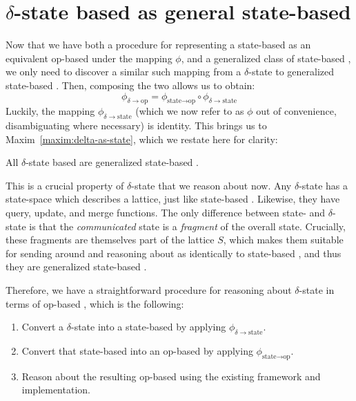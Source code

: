 \section{$\delta$-state based \CRDTs as general state-based \CRDTs}
\label{sec:delta-as-state}
Now that we have both a procedure for representing a state-based \CRDT as an
equivalent op-based \CRDT under the mapping $\phi$, and a generalized class of
state-based \CRDTs, we only need to discover a similar such mapping from a
$\delta$-state to generalized state-based \CRDT.  Then, composing the two allows
us to obtain:
\[
  \phi_{\delta \to \text{op}} =
    \phi_{\text{state} \to \text{op}} \circ
    \phi_{\delta \to \text{state}}
\]
Luckily, the mapping $\phi_{\delta \to \text{state}}$ (which we now refer to
as $\phi$ out of convenience, disambiguating where necessary) is identity.
This brings us to Maxim~\ref{maxim:delta-as-state}, which we restate here for
clarity:

\setcounter{maxim}{1}
\begin{maxim}
  All $\delta$-state based \CRDTs are generalized state-based \CRDTs.
\end{maxim}

This is a crucial property of $\delta$-state \CRDTs that we reason about now. Any
$\delta$-state \CRDT has a state-space which describes a lattice, just like
state-based \CRDTs. Likewise, they have query, update, and merge functions. The
only difference between state- and $\delta$-state \CRDTs is that the
\emph{communicated} state is a \emph{fragment} of the overall state. Crucially,
these fragments are themselves part of the lattice $S$, which makes them
suitable for sending around and reasoning about as identically to state-based
\CRDTs, and thus they are generalized state-based \CRDTs.

Therefore, we have a straightforward procedure for reasoning about
$\delta$-state \CRDTs in terms of op-based \CRDTs, which is the following:
\begin{enumerate}
  \item Convert a $\delta$-state \CRDT into a state-based \CRDT by applying
    $\phi_{\delta \to \text{state}}$.
  \item Convert that state-based \CRDT into an op-based \CRDT by applying
    $\phi_{\text{state} \to \text{op}}$.
  \item Reason about the resulting op-based \CRDT using the existing framework
    and implementation.
\end{enumerate}
